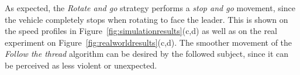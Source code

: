 \documentclass[journal]{IEEEtran}
\begin{document}



As expected, the \textit{Rotate and go} strategy performs a \textit{stop and go} movement, since the vehicle completely stops when rotating to face the leader. This is shown on the speed profiles in Figure~\ref{fig:simulationresults}(c,d) as well as on the real experiment on Figure~\ref{fig:realworldresults}(c,d).    The smoother movement of the \textit{Follow the thread} algorithm can be desired by the followed subject, since it can be perceived as less violent or unexpected. %




\end{document}
